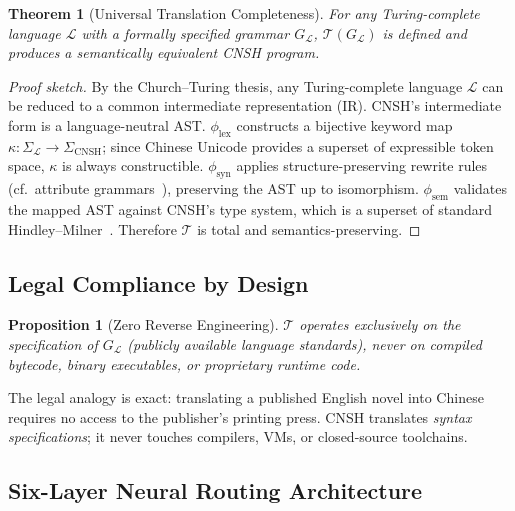 \documentclass[conference]{IEEEtran}
\newtheorem{theorem}{Theorem}
\newtheorem{proposition}{Proposition}
\begin{document}
\begin{theorem}[Universal Translation Completeness]
For any Turing-complete language $\mathcal{L}$ with a
formally specified grammar $G_{\mathcal{L}}$,
$\mathcal{T}(G_{\mathcal{L}})$ is defined and produces a
semantically equivalent CNSH program.
\end{theorem}

\begin{proof}[Proof sketch]
By the Church--Turing thesis, any Turing-complete language
$\mathcal{L}$ can be reduced to a common intermediate
representation (IR).
CNSH's intermediate form is a language-neutral AST.
$\phi_{\text{lex}}$ constructs a bijective keyword map
$\kappa: \Sigma_{\mathcal{L}} \to \Sigma_{\text{CNSH}}$;
since Chinese Unicode provides a superset of expressible
token space, $\kappa$ is always constructible.
$\phi_{\text{syn}}$ applies structure-preserving rewrite rules
(cf.\ attribute grammars~\cite{Knuth1968}), preserving the
AST up to isomorphism.
$\phi_{\text{sem}}$ validates the mapped AST against
CNSH's type system, which is a superset of standard
Hindley--Milner~\cite{Milner1978}.
Therefore $\mathcal{T}$ is total and semantics-preserving.
\end{proof}

\subsection{Legal Compliance by Design}

\begin{proposition}[Zero Reverse Engineering]
$\mathcal{T}$ operates exclusively on the \emph{specification}
of $G_{\mathcal{L}}$ (publicly available language standards),
never on compiled bytecode, binary executables, or proprietary
runtime code.
\end{proposition}

The legal analogy is exact: translating a published English novel
into Chinese requires no access to the publisher's printing press.
CNSH translates \emph{syntax specifications}; it never touches
compilers, VMs, or closed-source toolchains.

\subsection{Six-Layer Neural Routing Architecture}
\end{document}
